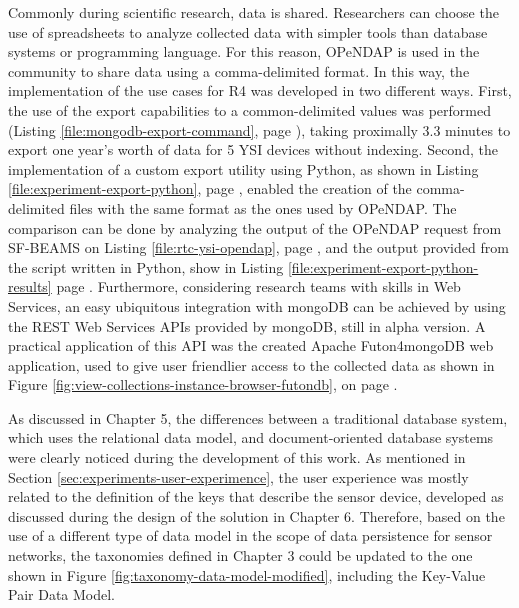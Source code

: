 Commonly during scientific research, data is shared. Researchers can choose
the use of spreadsheets to analyze collected data with simpler tools than
database systems or programming language. For this reason, OPeNDAP is used in
the community to share data using a comma-delimited format. In this way, the
implementation of the use cases for R4 was developed in two different ways.
First, the use of the export capabilities to a common-delimited values was
performed (Listing \ref{file:mongodb-export-command}, page
\pageref{file:mongodb-export-command}), taking proximally 3.3 minutes to export
one year's worth of data for 5 YSI devices without indexing. Second, the
implementation of a custom export utility using Python, as shown in Listing
\ref{file:experiment-export-python}, page
\pageref{file:experiment-export-python}, enabled the creation of the
comma-delimited files with the same format as the ones used by OPeNDAP. The
comparison can be done by analyzing the output of the OPeNDAP request from
SF-BEAMS on Listing \ref{file:rtc-ysi-opendap}, page
\pageref{file:rtc-ysi-opendap}, and the output provided from the script
written in Python, show in Listing \ref{file:experiment-export-python-results}
page \pageref{file:experiment-export-python-results}. Furthermore, considering
research teams with skills in Web Services, an easy ubiquitous integration
with mongoDB can be achieved by using the REST Web Services APIs provided by
mongoDB, still in alpha version. A practical application of this API was the
created Apache Futon4mongoDB web application, used to give user friendlier
access to the collected data as shown in Figure
\ref{fig:view-collections-instance-browser-futondb}, on page
\pageref{fig:view-collections-instance-browser-futondb}.
 
As discussed in Chapter 5, the differences between a traditional database
system, which uses the relational data model, and document-oriented database
systems were clearly noticed during the development of this work. As mentioned
in Section \ref{sec:experiments-user-experimence}, the user experience was
mostly related to the definition of the keys that describe the sensor device,
developed as discussed during the design of the solution in Chapter 6. 
Therefore, based on the use of a different type of data model in the scope of
data persistence for sensor networks, the taxonomies defined in Chapter 3
could be updated to the one shown in Figure
\ref{fig:taxonomy-data-model-modified}, including the Key-Value Pair Data
Model.

